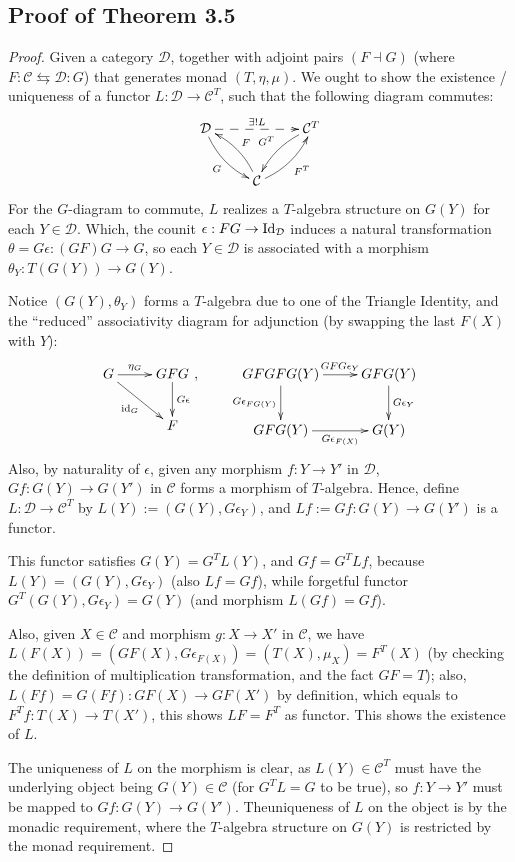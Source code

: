 \documentclass{article}
\begin{document}
\subsection{Proof of Theorem 3.5}\label{thm3_5}
\begin{proof}
    Given a category $\mathcal{D}$, together with adjoint pairs $(F\dashv G)$ (where $F:\mathcal{C}\leftrightarrows\mathcal{D}:G$) that generates monad $(T,\eta,\mu)$. We ought to show the existence / uniqueness of a functor $L:\mathcal{D}\rightarrow\mathcal{C}^T$, such that the following diagram commutes:
    \[\xymatrix{
        \mathcal{D} \ar@/_{.5pc}/[dr]_{G} \ar@{-->}[rr]^-{\exists ! L} && \mathcal{C}^T \ar@/_{.5pc}/[dl]_{G^T}\\
        & \mathcal{C} \ar@/_{.5pc}/[ul]_{F} \ar@/_{.5pc}/[ur]_{F^T}
    }\]
    For the $G$-diagram to commute, $L$ realizes a $T$-algebra structure on $G(Y)$ for each $Y\in\mathcal{D}$. Which, the counit $\epsilon:FG\rightarrow \mathrm{Id}_{\mathcal{D}}$ induces a natural transformation $\theta=G\epsilon:(GF)G\rightarrow G$, so each $Y\in\mathcal{D}$ is associated with a morphism $\theta_Y:T(G(Y))\rightarrow G(Y)$.

    Notice $(G(Y),\theta_Y)$ forms a $T$-algebra due to one of the Triangle Identity, and the ``reduced'' associativity diagram for adjunction (by swapping the last $F(X)$ with $Y$):
    \[\xymatrix{
        G \ar[r]^-{\eta_G} \ar[dr]_-{\id_G} & GFG \ar[d]^-{G\epsilon}\\
        & F
    },\quad\quad \xymatrix{
        GFGFG(Y) \ar[d]_-{G\epsilon_{FG(Y)}} \ar[r]^-{GFG\epsilon_{Y}} & GFG(Y) \ar[d]^-{G\epsilon_{Y}}\\
        GFG(Y) \ar[r]_-{G\epsilon_{F(X)}} & G(Y)
    }\]
    Also, by naturality of $\epsilon$, given any morphism $f:Y\rightarrow Y'$ in $\mathcal{D}$, $Gf:G(Y)\rightarrow G(Y')$ in $\mathcal{C}$ forms a morphism of $T$-algebra. Hence, define $L:\mathcal{D}\rightarrow \mathcal{C}^T$ by $L(Y):= (G(Y), G\epsilon_Y)$, and $Lf:= Gf:G(Y)\rightarrow G(Y')$ is a functor.

    This functor satisfies $G(Y) = G^T L(Y)$, and $Gf = G^T Lf$, because $L(Y) = (G(Y),G\epsilon_Y)$ (also $Lf = Gf$), while forgetful functor $G^T(G(Y),G\epsilon_Y) = G(Y)$ (and morphism $L(Gf)= Gf$). 
    
    Also, given $X\in\mathcal{C}$ and morphism $g:X\rightarrow X'$ in $\mathcal{C}$, we have $L(F(X)) = (GF(X), G\epsilon_{F(X)}) = (T(X),\mu_X) = F^T(X)$ (by checking the definition of multiplication transformation, and the fact $GF = T$); also, $L(Ff) = G(Ff):GF(X)\rightarrow GF(X')$ by definition, which equals to $F^T f:T(X)\rightarrow T(X')$, this shows $LF = F^T$ as functor. This shows the existence of $L$.

    \hfil

    The uniqueness of $L$ on the morphism is clear, as $L(Y)\in\mathcal{C}^T$ must have the underlying object being $G(Y)\in\mathcal{C}$ (for $G^TL = G$ to be true), so $f:Y\rightarrow Y'$ must be mapped to $Gf:G(Y)\rightarrow G(Y')$. Theuniqueness of $L$ on the object is by the monadic requirement, where the $T$-algebra structure on $G(Y)$ is restricted by the monad requirement.
\end{proof}
\end{document}

